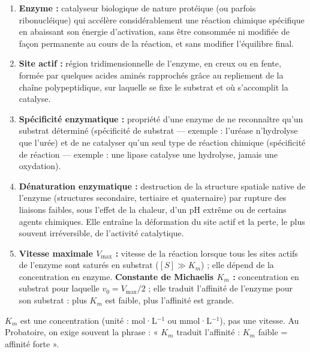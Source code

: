 \documentclass[11pt]{article}
\newcommand{\cle}[1]{{\popxbold\color{popdark}#1}}
\begin{document}
\begin{corrige}
\begin{enumerate}
    \item \textbf{Enzyme :} catalyseur biologique de nature protéique (ou parfois ribonucléique) qui accélère considérablement une réaction chimique spécifique en abaissant son énergie d'activation, sans être consommée ni modifiée de façon permanente au cours de la réaction, et sans modifier l'équilibre final.
    \item \textbf{Site actif :} région tridimensionnelle de l'enzyme, en creux ou en fente, formée par quelques acides aminés rapprochés grâce au repliement de la chaîne polypeptidique, sur laquelle se fixe le substrat et où s'accomplit la catalyse.
    \item \textbf{Spécificité enzymatique :} propriété d'une enzyme de ne reconnaître qu'un substrat déterminé (\cle{spécificité de substrat} — exemple : l'uréase n'hydrolyse que l'urée) et de ne catalyser qu'un seul type de réaction chimique (\cle{spécificité de réaction} — exemple : une lipase catalyse une hydrolyse, jamais une oxydation).
    \item \textbf{Dénaturation enzymatique :} destruction de la structure spatiale native de l'enzyme (structures secondaire, tertiaire et quaternaire) par rupture des liaisons faibles, sous l'effet de la chaleur, d'un pH extrême ou de certains agents chimiques. Elle entraîne la déformation du site actif et la perte, le plus souvent irréversible, de l'activité catalytique.
    \item \textbf{Vitesse maximale $V_{\text{max}}$ :} vitesse de la réaction lorsque tous les sites actifs de l'enzyme sont saturés en substrat ($[S] \gg K_m$) ; elle dépend de la concentration en enzyme. \textbf{Constante de Michaelis $K_m$ :} concentration en substrat pour laquelle $v_0 = V_{\text{max}}/2$ ; elle traduit l'affinité de l'enzyme pour son substrat : plus $K_m$ est faible, plus l'affinité est grande.
\end{enumerate}
\end{corrige}

\begin{attention}
$K_m$ est une concentration (unité : mol·L$^{-1}$ ou mmol·L$^{-1}$), pas une vitesse. Au Probatoire, on exige souvent la phrase : « $K_m$ traduit l'affinité : $K_m$ faible = affinité forte ».
\end{attention}
\end{document}
